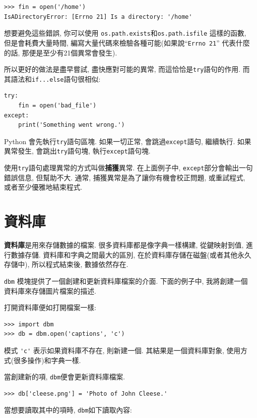 \documentclass[10pt]{book}
\begin{document}
\begin{verbatim}
>>> fin = open('/home')
IsADirectoryError: [Errno 21] Is a directory: '/home'
\end{verbatim}
%
想要避免這些錯誤, 你可以使用 {\tt os.path.exists}和{\tt os.path.isfile} 這樣的函數, 
但是會耗費大量時間, 編寫大量代碼來檢驗各種可能(如果說``{\tt Errno 21}'' 代表什麼的話, 
那便是至少有21個異常會發生). 


所以更好的做法是盡早嘗試, 盡快應對可能的異常, 而這恰恰是{\tt try}語句的作用. 
而其語法和{\tt if...else}語句很相似:

\begin{verbatim}
try:    
    fin = open('bad_file')
except:
    print('Something went wrong.')
\end{verbatim}
%
Python 會先執行{\tt try}語句區塊. 
如果一切正常, 會跳過{\tt except}語句, 繼續執行. 
如果異常發生, 會跳出{\tt try}語句塊, 執行{\tt except}語句塊. 

使用{\tt try}語句處理異常的方式叫做{\bf 捕獲}異常. 
在上面例子中, {\tt except}部分會輸出一句錯誤信息, 但幫助不大. 
通常, 捕獲異常是為了讓你有機會校正問題, 或重試程式, 或者至少優雅地結束程式. 


\section{資料庫}

{\bf 資料庫}是用來存儲數據的檔案. 
很多資料庫都是像字典一樣構建, 從鍵映射到值, 進行數據存儲. 
資料庫和字典之間最大的區別, 在於資料庫存儲在磁盤(或者其他永久存儲中), 
所以程式結束後, 數據依然存在. 
 

 {\tt dbm} 模塊提供了一個創建和更新資料庫檔案的介面. 
下面的例子中, 我將創建一個資料庫來存儲圖片檔案的描述. 

打開資料庫便如打開檔案一樣:

\begin{verbatim}
>>> import dbm
>>> db = dbm.open('captions', 'c')
\end{verbatim}
%

模式 \verb"'c'" 表示如果資料庫不存在, 則新建一個. 
其結果是一個資料庫對象, 使用方式(很多操作)和字典一樣.

當創建新的項, {\tt dbm}便會更新資料庫檔案.

\begin{verbatim}
>>> db['cleese.png'] = 'Photo of John Cleese.'
\end{verbatim}
%
當想要讀取其中的項時,  {\tt dbm}如下讀取內容:
\end{document}
